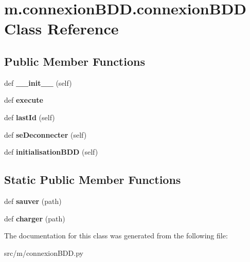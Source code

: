 \hypertarget{classm_1_1connexion_b_d_d_1_1connexion_b_d_d}{}\section{m.\+connexion\+B\+D\+D.\+connexion\+B\+D\+D Class Reference}
\label{classm_1_1connexion_b_d_d_1_1connexion_b_d_d}
\subsection*{Public Member Functions}
\begin{DoxyCompactItemize}
\item 
\hypertarget{classm_1_1connexion_b_d_d_1_1connexion_b_d_d_a44098936b1bfaa16f892e82d228be2e7}{}def {\bfseries \+\_\+\+\_\+init\+\_\+\+\_\+} (self)\label{classm_1_1connexion_b_d_d_1_1connexion_b_d_d_a44098936b1bfaa16f892e82d228be2e7}

\item 
\hypertarget{classm_1_1connexion_b_d_d_1_1connexion_b_d_d_ad85be5d031c705459d5daf21f887c681}{}def {\bfseries execute}\label{classm_1_1connexion_b_d_d_1_1connexion_b_d_d_ad85be5d031c705459d5daf21f887c681}

\item 
\hypertarget{classm_1_1connexion_b_d_d_1_1connexion_b_d_d_a77c1d4c09e5826a3cbfaf24ebcf0e748}{}def {\bfseries last\+Id} (self)\label{classm_1_1connexion_b_d_d_1_1connexion_b_d_d_a77c1d4c09e5826a3cbfaf24ebcf0e748}

\item 
\hypertarget{classm_1_1connexion_b_d_d_1_1connexion_b_d_d_a7d61ed69eea22094bf19ad74c4944228}{}def {\bfseries se\+Deconnecter} (self)\label{classm_1_1connexion_b_d_d_1_1connexion_b_d_d_a7d61ed69eea22094bf19ad74c4944228}

\item 
\hypertarget{classm_1_1connexion_b_d_d_1_1connexion_b_d_d_a35e46eccfe62372eb2af82d4358314c1}{}def {\bfseries initialisation\+B\+D\+D} (self)\label{classm_1_1connexion_b_d_d_1_1connexion_b_d_d_a35e46eccfe62372eb2af82d4358314c1}

\end{DoxyCompactItemize}
\subsection*{Static Public Member Functions}
\begin{DoxyCompactItemize}
\item 
\hypertarget{classm_1_1connexion_b_d_d_1_1connexion_b_d_d_a1a6eaed01a5412ac546d4bbc1300b861}{}def {\bfseries sauver} (path)\label{classm_1_1connexion_b_d_d_1_1connexion_b_d_d_a1a6eaed01a5412ac546d4bbc1300b861}

\item 
\hypertarget{classm_1_1connexion_b_d_d_1_1connexion_b_d_d_ab10fdfa685865b31eb2783afc54a3f00}{}def {\bfseries charger} (path)\label{classm_1_1connexion_b_d_d_1_1connexion_b_d_d_ab10fdfa685865b31eb2783afc54a3f00}

\end{DoxyCompactItemize}


The documentation for this class was generated from the following file\+:\begin{DoxyCompactItemize}
\item 
src/m/connexion\+B\+D\+D.\+py\end{DoxyCompactItemize}

